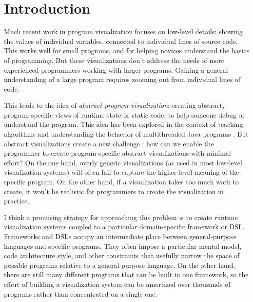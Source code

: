 \documentclass{sigchi}
\begin{document}

\hypertarget{introduction}{%
\section{Introduction}\label{introduction}}

Much recent work in program visualization
\autocite{victora,guo2013,hoffswell2018a,pollock2019,kasibatla2018}
focuses on low-level details: showing the values of individual
variables, connected to individual lines of source code. This works well
for small programs, and for helping novices understand the basics of
programming. But these visualizations don't address the needs of more
experienced programmers working with larger programs. Gaining a general
understanding of a large program requires zooming out from individual
lines of code.

This leads to the idea of \emph{abstract program visualization}:
creating abstract, program-specific views of runtime state or static
code, to help someone debug or understand the program. This idea has
been explored in the context of teaching algorithms
\autocite{brown1984,stasko1990} and understanding the behavior of
multithreaded Java programs \autocite{reiss2003,reiss2005}. But abstract
visualizations create a new challenge \autocite{reiss2007}: how can we
enable the programmer to create program-specific abstract visualizations
with minimal effort? On the one hand, overly generic visualizations (as
used in most low-level visualization systems) will often fail to capture
the higher-level meaning of the specific program. On the other hand, if
a visualization takes too much work to create, it won't be realistic for
programmers to create the visualization in practice.

I think a promising strategy for approaching this problem is to create
runtime visualization systems coupled to a particular domain-specific
framework or DSL. Frameworks and DSLs occupy an intermediate place
between general-purpose languages and specific programs. They often
impose a particular mental model, code architecture style, and other
constraints that usefully narrow the space of possible programs relative
to a general-purpose language. On the other hand, there are still many
different programs that can be built in one framework, so the effort of
building a visualization system can be amortized over thousands of
programs rather than concentrated on a single one.
\end{document}
